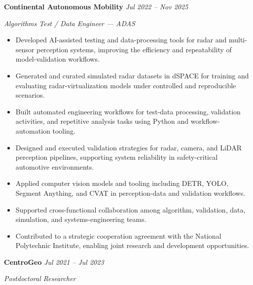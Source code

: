 \documentclass[10pt]{article}
\begin{document}
\textbf{Continental Autonomous Mobility}
\hfill
\textit{Jul 2022 -- Nov 2025}

\textit{Algorithms Test / Data Engineer --- ADAS}

\begin{itemize}
    \item Developed AI-assisted testing and data-processing tools for radar
    and multi-sensor perception systems, improving the efficiency and
    repeatability of model-validation workflows.

    \item Generated and curated simulated radar datasets in dSPACE for training and evaluating radar-virtualization models under controlled and reproducible scenarios.

    \item Built automated engineering workflows for test-data processing,
    validation activities, and repetitive analysis tasks using Python and
    workflow-automation tooling.

    \item Designed and executed validation strategies for radar, camera, and
    LiDAR perception pipelines, supporting system reliability in
    safety-critical automotive environments.

    \item Applied computer vision models and tooling including DETR, YOLO,
    Segment Anything, and CVAT in perception-data and validation workflows.

    \item Supported cross-functional collaboration among algorithm,
    validation, data, simulation, and systems-engineering teams.

    \item Contributed to a strategic cooperation agreement with the National
    Polytechnic Institute, enabling joint research and development
    opportunities.
\end{itemize}

\textbf{CentroGeo}
\hfill
\textit{Jul 2021 -- Jul 2023}

\textit{Postdoctoral Researcher}
\end{document}
